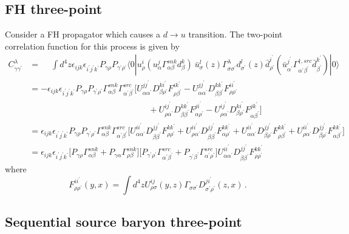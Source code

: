 \documentclass[prd,12pt,superscriptaddress,tightenlines,nofootinbib]{revtex4}
\def\a{{\alpha}}
\def\b{{\beta}}
\def\g{{\gamma}}
\def\G{{\Gamma}}
\def\l{{\lambda}}
\def\s{{\sigma}}
\def\ip{{i^\prime}}
\def\jp{{j^\prime}}
\def\kp{{k^\prime}}
\def\ap{{\alpha^\prime}}
\def\bp{{\beta^\prime}}
\def\gp{{\gamma^\prime}}
\def\rp{{\rho^\prime}}
\def\sp{{\sigma^\prime}}
\begin{document}
\subsection{FH three-point}
\bigskip
Consider a FH propagator which causes a $d\rightarrow u$ transition.
The two-point correlation function for this process is given by
\begin{align}
C^\l_{\g\gp} &= \phantom{-}\int d^4 z \epsilon_{ijk} \epsilon_{\ip\jp\kp} P_{\g\rho} P_{\gp\rp}
	\langle 0|
		u^i_\rho (u^j_\a \G^{snk}_{\a\b} d^k_\b ) \
		\bar{u}^l_\s(z) \G^\l_{\s\sp} d^l_{\sp}(z)
		\bar{d}^\ip_\rp (\bar{u}^{\jp}_{\ap} \G^{\dagger,src}_{\ap\bp} \bar{d}^\kp_\bp )
	|0\rangle
\nonumber\\&=
	-\epsilon_{ijk} \epsilon_{\ip\jp\kp} P_{\g\rho} P_{\gp\rp}
	\G^{snk}_{\a\b} \G^{src}_{\ap\bp}
	\Big[
		U^{j\jp}_{\a\ap} D^{k\ip}_{\b\rp} F^{i\kp}_{\rho\bp}
		-U^{j\jp}_{\a\ap} D^{k\kp}_{\b\bp} F^{i\ip}_{\rho\rp}
\nonumber\\&\qquad\qquad\qquad\qquad\qquad\qquad\qquad
		+U^{i\jp}_{\rho\ap} D^{k\kp}_{\b\bp} F^{j\ip}_{\a\rp}
		-U^{i\jp}_{\rho\ap} D^{k\ip}_{\b\rp} F^{j\kp}_{\a\bp}
	\Big]
\nonumber\\&=
	\epsilon_{ijk} \epsilon_{\ip\jp\kp} P_{\g\rho} P_{\gp\rp}
	\G^{snk}_{\a\b} \G^{src}_{\ap\bp}
	\Big[
		U^{i\ip}_{\a\ap} D^{j\jp}_{\b\bp} F^{k\kp}_{\rho\rp}
		+U^{i\ip}_{\rho\ap} D^{j\jp}_{\b\bp} F^{k\kp}_{\a\rp}
		+U^{i\ip}_{\a\ap} D^{j\jp}_{\b\rp} F^{k\kp}_{\rho\bp}
		+U^{i\ip}_{\rho\ap} D^{j\jp}_{\b\rp} F^{k\kp}_{\a\bp}
	\Big]
\nonumber\\&=
	\epsilon_{ijk} \epsilon_{\ip\jp\kp}
	\Big[
		P_{\g\rho} \G^{snk}_{\a\b}
		+P_{\g\a} \G^{snk}_{\rho\b}
	\Big] \Big[
		P_{\gp\rp} \G^{src}_{\ap\bp} + P_{\gp\bp} \G^{src}_{\ap\rp}
	\Big]
	U^{i\ip}_{\a\ap} D^{j\jp}_{\b\bp} F^{k\kp}_{\rho\rp}
\end{align}
where
\begin{equation}
F^{i\ip}_{\rho\rp}(y,x) = \int d^4z U^{ij}_{\rho\s}(y,z)\G_{\s\sp} D^{j\ip}_{\sp\rp}(z,x)\, .
\end{equation}

\subsection{Sequential source baryon three-point}
\end{document}

